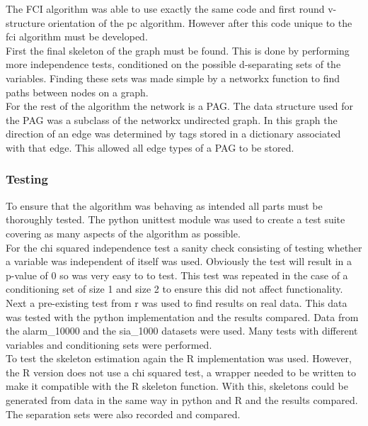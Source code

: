 \documentclass{article}
\begin{document}
The FCI algorithm was able to use exactly the same code and first round v-structure orientation of the pc algorithm. However after this code unique to the fci algorithm must be developed.\\

First the final skeleton of the graph must be found. This is done by performing more independence tests, conditioned on the possible d-separating sets of the variables. Finding these sets was made simple by a networkx function to find paths between nodes on a graph.\\

For the rest of the algorithm the network is a PAG. The data structure used for the PAG was a subclass of the networkx undirected graph. In this graph the direction of an edge was determined by tags stored in a dictionary associated with that edge. This allowed all edge types of a PAG to be stored.\\ 




\subsubsection{Testing}

To ensure that the algorithm was behaving as intended all parts must be thoroughly tested. The python unittest module was used to create a test suite covering as many aspects of the algorithm as possible.\\

For the chi squared independence test a sanity check consisting of testing whether a variable was independent of itself was used. Obviously the test will result in a p-value of 0 so was very easy to to test. This test was repeated in the case of a conditioning set of size 1 and size 2 to ensure this did not affect functionality.\\

Next a pre-existing test from r was used to find results on real data. This data was tested with the python implementation and the results compared. Data from the alarm\_10000 and the sia\_1000 datasets were used. Many tests with different variables and conditioning sets were performed.\\

To test the skeleton estimation again the R implementation was used. However, the R version does not use a chi squared test, a wrapper needed to be written to make it compatible with the R skeleton function. With this, skeletons could be generated from data in the same way in python and R and the results compared. The separation sets were also recorded and compared.\\
\end{document}
